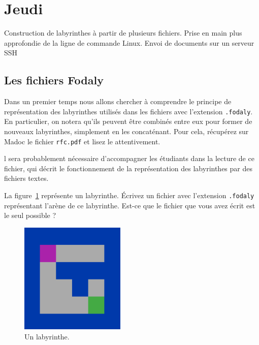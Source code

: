 \documentclass[a4paper]{article}
\newenvironment{objectif}{%
  \begin{framed}%
  \noindent{\bf Objectifs du jour~:}%
}{%
  \end{framed}%
}
\newenvironment{enseignants}[1]{\noindent\color{blue}{\bf #1}}{}
\begin{document}


\section{Jeudi}

\begin{objectif}
  Construction de labyrinthes à partir de plusieurs fichiers.
  Prise en main plus approfondie de la ligne de commande Linux.
  Envoi de documents sur un serveur SSH
\end{objectif}

\subsection{Les fichiers Fodaly}

Dans un premier temps nous allons chercher à comprendre le principe de représentation des labyrinthes utilisés dans les fichiers avec l'extension \verb|.fodaly|.
En particulier, on notera qu'ils peuvent être combinés entre eux pour former de nouveaux labyrinthes, simplement en les concaténant.
Pour cela, récupérez sur Madoc le fichier \verb|rfc.pdf| et lisez le attentivement.

\begin{enseignants}
  Il sera probablement nécessaire d'accompagner les étudiants dans la lecture de ce fichier, qui décrit le fonctionnement de la représentation des labyrinthes par des fichiers textes.
\end{enseignants}

La figure~\ref{fig:alab} représente un labyrinthe.
Écrivez un fichier avec l'extension \verb|.fodaly| représentant l'arène de ce labyrinthe.
Est-ce que le fichier que vous avez écrit est le seul possible ?

\begin{figure}[htbp]
  \centering
  \includegraphics[width=5cm]{fig1.png}
  \caption{Un labyrinthe.}\label{fig:alab}
\end{figure}
\end{document}
